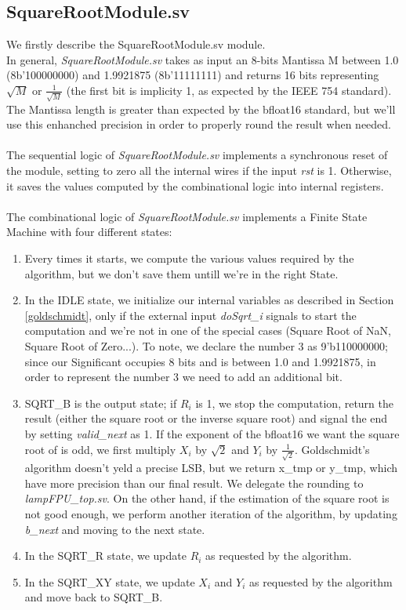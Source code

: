 \subsection{SquareRootModule.sv}
We firstly describe the SquareRootModule.sv module. \\
In general, \emph{SquareRootModule.sv} takes as input an 8-bits Mantissa M between 1.0 (8b'100000000) and 1.9921875 (8b'11111111) and returns 16 bits representing $\sqrt{M}$ or $\frac{1}{\sqrt{M}}$ (the first bit is implicity 1, as expected by the IEEE 754 standard). The Mantissa length is greater than expected by the bfloat16 standard, but we'll use this enhanched precision in order to properly round the result when needed.\\\\
The sequential logic of \emph{SquareRootModule.sv} implements a synchronous reset of the module, setting to zero all the internal wires if the input \emph{rst} is 1. Otherwise, it saves the values computed by the combinational logic into internal registers.\\\\
The combinational logic of \emph{SquareRootModule.sv} implements a Finite State Machine with four different states:
\begin{enumerate}
\item Every times it starts, we compute the various values required by the algorithm, but we don't save them untill we're in the right State.
\item In the IDLE state, we initialize our internal variables as described in Section \ref{goldschmidt}, only if the external input \emph{doSqrt\_i} signals to start the computation and we're not in one of the special cases (Square Root of NaN, Square Root of Zero...). To note, we declare the number 3 as 9'b110000000; since our Significant occupies 8 bits and is between 1.0 and 1.9921875, in order to represent the number 3 we need to add an additional bit. 
\item SQRT\_B is the output state; if $R_i$ is 1, we stop the computation, return the result (either the square root or the inverse square root) and signal the end by setting \emph{valid\_next} as 1. If the exponent of the bfloat16 we want the square root of is odd, we first multiply $X_i$ by $\sqrt{2}$ and $Y_i$ by $\frac{1}{\sqrt{2}}$. Goldschmidt's algorithm doesn't yeld a precise LSB, but we return x\_tmp or y\_tmp, which have more precision than our final result. We delegate the rounding to \emph{lampFPU\_top.sv}. On the other hand, if the estimation of the square root is not good enough, we perform another iteration of the algorithm, by updating \emph{b\_next} and moving to the next state.
\item In the SQRT\_R state, we update $R_i$ as requested by the algorithm.
\item In the SQRT\_XY state, we update $X_i$ and $Y_i$ as requested by the algorithm and move back to SQRT\_B.
\end{enumerate}

